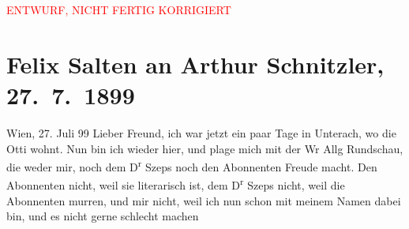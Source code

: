 
\begin{center}
            \textcolor{red}{ENTWURF, NICHT FERTIG KORRIGIERT}
                      \end{center}
            
         
         \renewcommand{\erwaehntePersonen}{Personen: Richard Beer-Hofmann, Leopold Geiringer, Paul Goldmann, Ottilie Salten, Moriz Szeps, Jakob Wassermann}
         \renewcommand{\erwaehnteInstitutionen}{Institutionen: Wiener Allgemeine Montagszeitung}
         \renewcommand{\erwaehnteOrte}{Orte: Unterach am Attersee, Wien}
         \renewcommand{\erwaehnteWerke}{Werke: ?? [Feuilleton über Paul Goldmann]}
               \section[Felix Salten an Arthur Schnitzler, 27. 7. 1899]{ Felix Salten an Arthur Schnitzler, 27. 7. 1899}\nopagebreak{}\rehead{ }\begin{ledgroupsized}[t]{13cm}\normalsize\beginnumbering \toendnotes[C]{\smallbreak\pagebreak[2]} 
\toendnotes[C]{\smallbreak}\pstart
           \raggedleft{}{\pb}Wien, 27. Juli 99\pend
           \pstart
           Lieber Freund, ich war jetzt ein paar Tage in Unterach, wo die Otti
               wohnt. Nun bin ich wieder hier, und plage mich mit der Wr Allg Rundschau, die weder mir, noch dem D\textsuperscript{r}{ }Szeps noch den Abonnenten Freude macht. Den Abonnenten
               nicht, weil sie literarisch ist, dem D\textsuperscript{r}{ }Szeps nicht, weil die Abonnenten murren, und mir nicht,
               weil ich nun schon mit meinem Namen dabei bin, und es nicht gerne schlecht machen

\end{ledgroupsized}
